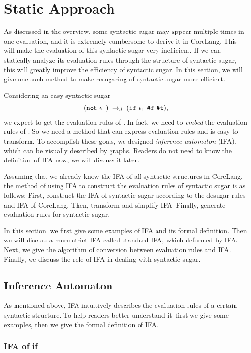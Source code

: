 \section{Static Approach}
\label{sec:ruleDerivation}

As discussed in the overview, some syntactic sugar may appear multiple times in one evaluation, and it is extremely cumbersome to derive it in CoreLang. This will make the evaluation of this syntactic sugar very inefficient. If we can statically analyze its evaluation rules through the structure of syntactic sugar, this will greatly improve the efficiency of syntactic sugar. In this section, we will give one such method to make resugaring of syntactic sugar more efficient.

Considering an easy syntactic sugar
\[(\mbox{\tt not}~e_1) ~\rightarrow_d~ (\mbox{\tt if}~e_1~\mbox{\tt \#f}~\mbox{\tt \#t}),\]
we expect to get the evaluation rules of . In fact, we need to \textit{embed} the evaluation rules of . So we need a method that can express evaluation rules and is easy to transform. To accomplish these goals, we designed \textit{inference automaton} (IFA), which can be visually described by graphs. Readers do not need to know the definition of IFA now, we will discuss it later.

Assuming that we already know the IFA of all syntactic structures in CoreLang, the method of using IFA to construct the evaluation rules of syntactic sugar is as follows: First, construct the IFA of syntactic sugar according to the desugar rules and IFA of CoreLang. Then, transform and simplify IFA. Finally, generate evaluation rules for syntactic sugar.

In this section, we first give some examples of IFA and its formal definition. Then we will discuss a more strict IFA called standard IFA, which deformed by IFA. Next, we give the algorithm of conversion between evaluation rules and IFA. Finally, we discuss the role of IFA in dealing with syntactic sugar.

\subsection{Inference Automaton}

As mentioned above, IFA intuitively describes the evaluation rules of a certain syntactic structure. To help readers better understand it, first we give some examples, then we give the formal definition of IFA.

\subsubsection{IFA of if}

